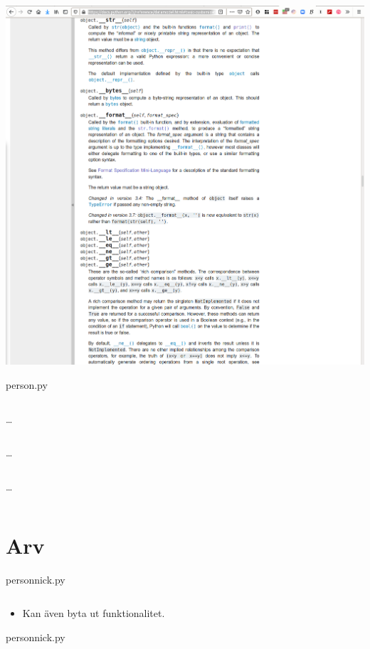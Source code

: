 \begin{frame}
  \includegraphics[width=\columnwidth]{figs/docs-special-methods.png}
\end{frame}

\begin{frame}[fragile]
  person.py \hrulefill
  \inputminted[linenos,firstline=3,lastline=4]{python}{examples/person.py}
  \dots
  \inputminted[autogobble=false,linenos,firstline=53,lastline=57]{python}{examples/person.py}
  \dots
  \inputminted[autogobble=false,linenos,firstline=65,lastline=66]{python}{examples/person.py}
  \dots
  \inputminted[autogobble=false,linenos,firstline=81,lastline=84]{python}{examples/person.py}
\end{frame}


\section{Arv}

\begin{frame}[fragile]
  person\textunderscore nick.py \hrulefill
  \inputminted[linenos,firstline=3,lastline=19]{python}{examples/person_nick.py}
\end{frame}

\begin{frame}[fragile]
  \begin{remark}
    \begin{itemize}
      \item Kan även byta ut funktionalitet.
    \end{itemize}
  \end{remark}
  person\textunderscore nick.py \hrulefill
  \inputminted[linenos,firstline=21,lastline=29]{python}{examples/person_nick.py}
\end{frame}

